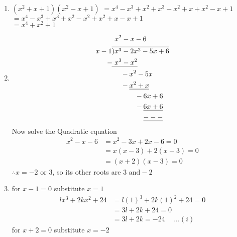 \begin{multicols}{2}
\begin{enumerate}[label={\textbf{\arabic*.}}]
    \item $(x^2 + x + 1)(x^2 - x + 1)$
        $ =  x^4 - x^3 + x ^2 + x^3 - x^2 + x + x^2 -x + 1$ \\
        $ =  x^4 - x^3 + x^3 + x ^2 - x^2 + x^2 + x  -x + 1$ \\
        $= x^4 + x^2 + 1$
    \item \begin{align*}
         & \hspace{ 4 pt} x ^2 - x -6 \\
        x -1 & \overline{) x^3 - 2x^2 - 5x + 6} \\
        -\hspace{-1pt} & \underline{ \hspace{4pt} x^ 3 - x^2} \\
        -\hspace{-23pt} & \hspace{25pt} x^2 - 5x  \\
       - \hspace{-23pt} &  \hspace{ 25pt} \underline{x^2 + x} \\
       - \hspace{-43pt} & \hspace{ 45pt} 6x + 6 \\
       - \hspace{-43pt} & \hspace{ 45pt} \underline{6x + 6}  \\
        & \hspace{ 45pt} \underline{---} 
    \end{align*}
   Now solve the Quadratic equation 
   \begin{align*} 
    x^2 - x - 6 &= x^2 - 3x + 2x - 6 = 0 \\
    &  = x(x - 3) + 2(x - 3) = 0 \\
    & =  (x + 2)(x - 3) = 0
   \end{align*}
   $\therefore x = -2 \text{ or } 3$, so its other roots are $3 \text{ and} -2$
    \item for $x-1 = 0$ substitute $x = 1$ 
    \begin{align*}
       lx^3 + 2kx^2 + 24 &= l(1)^3 + 2k(1)^2 + 24 = 0 \\
       & = 3l + 2k + 24 = 0 \\ 
       &= 3l + 2k = -24 \hspace{15pt}...(i)
    \end{align*}
    for $x+2 = 0$ substitute $x = -2$ 
    \begin{align*}

\end{align*}
\end{enumerate}
\end{multicols}
